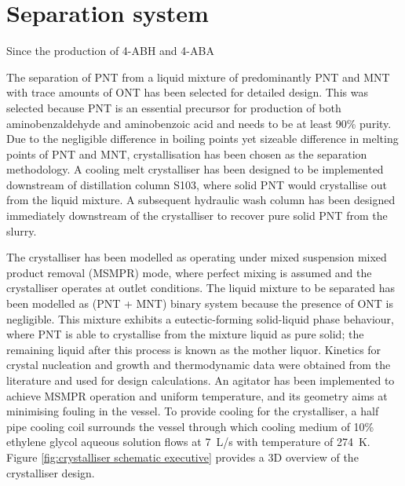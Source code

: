 \section*{Separation system}

Since the production of 4-ABH and 4-ABA

The separation of PNT from a liquid mixture of predominantly PNT and MNT with trace amounts of ONT has been selected for detailed design. This was selected because PNT is an essential precursor for production of both aminobenzaldehyde and aminobenzoic acid and needs to be at least 90\% purity. Due to the negligible difference in boiling points yet sizeable difference in melting points of PNT and MNT, crystallisation has been chosen as the separation methodology. A cooling melt crystalliser has been designed to be implemented downstream of distillation column S103, where solid PNT would crystallise out from the liquid mixture. A subsequent hydraulic wash column has been designed immediately downstream of the crystalliser to recover pure solid PNT from the slurry. 


The crystalliser has been modelled as operating under mixed suspension mixed product removal (MSMPR) mode, where perfect mixing is assumed and the crystalliser operates at outlet conditions. The liquid mixture to be separated has been modelled as (PNT + MNT) binary system because the presence of ONT is negligible. This mixture exhibits a eutectic-forming solid-liquid phase behaviour, where PNT is able to crystallise from the mixture liquid as pure solid; the remaining liquid after this process is known as the mother liquor. Kinetics for crystal nucleation and growth and thermodynamic data were obtained from the literature and used for design calculations. An agitator has been implemented to achieve MSMPR operation and uniform temperature, and its geometry aims at minimising fouling in the vessel. To provide cooling for the crystalliser, a half pipe cooling coil surrounds the vessel through which cooling medium of 10\% ethylene glycol aqueous solution flows at \SI{7}{L/s} with temperature of \SI{274}{K}. Figure \ref{fig:crystalliser schematic executive} provides a 3D overview of the crystalliser design.


